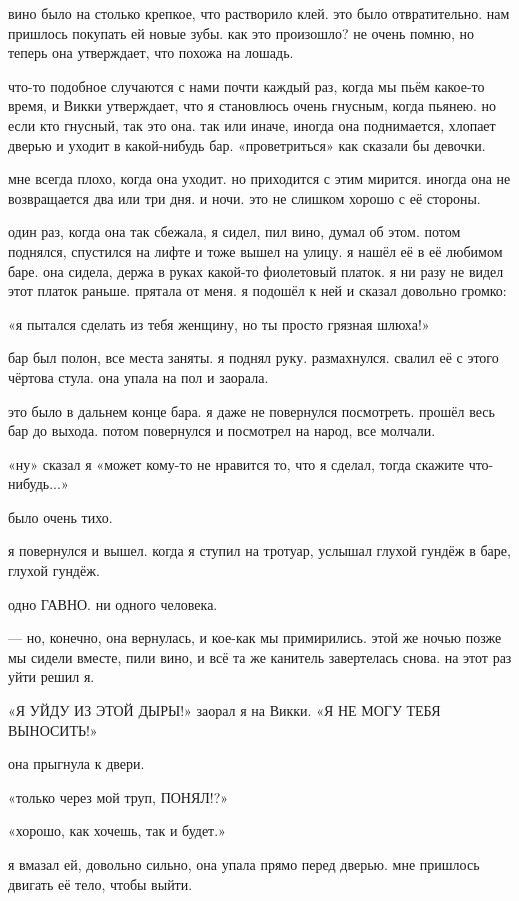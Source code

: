 вино было на столько крепкое, что растворило клей.
это было отвратительно.
нам пришлось покупать ей новые зубы.
как это произошло? не очень помню, но 
теперь она утверждает, что похожа на лошадь.

что-то подобное случаются с нами почти каждый раз, когда мы пьём какое-то
время, и Викки утверждает, что я становлюсь очень гнусным, когда пьянею.
но если кто гнусный, так это она.
так или иначе,  иногда она
поднимается, хлопает дверью и уходит в какой-нибудь бар.
«проветриться» как 
сказали бы девочки.

мне всегда плохо, когда она уходит.
но приходится с этим мирится.
иногда 
она не возвращается два или три дня.
и ночи.
это не слишком 
хорошо с её стороны.

один раз, когда она так сбежала, я сидел, пил вино, думал об этом.
потом 
поднялся, спустился на лифте и тоже вышел на улицу.
я нашёл её в её любимом 
баре.
она сидела, держа в руках какой-то фиолетовый платок.
я ни разу не видел 
этот платок раньше.
прятала от меня.
я подошёл к ней и сказал 
довольно громко:

«я пытался сделать из тебя женщину, но ты просто грязная шлюха!»

бар был полон, все места заняты.
я поднял руку.
размахнулся.
свалил её с 
этого чёртова стула.
она упала на пол и заорала.

это было в дальнем конце бара.
я даже не повернулся посмотреть.
прошёл весь бар до выхода.
потом повернулся и посмотрел на народ, все
молчали.

«ну» сказал я «может кому-то не нравится то, что я сделал, тогда
скажите что-нибудь...»

было очень тихо.

я повернулся и вышел.
когда я ступил на тротуар, услышал глухой гундёж в баре, глухой гундёж.

одно ГАВНО.
ни одного человека.

--- но, конечно, она вернулась, и кое-как мы примирились.
этой же ночью позже мы сидели вместе, пили вино, и всё та же канитель завертелась снова.
на этот раз уйти решил я.

«Я УЙДУ ИЗ ЭТОЙ ДЫРЫ!» заорал я на Викки.
«Я НЕ МОГУ ТЕБЯ ВЫНОСИТЬ!»

она прыгнула к двери.

«только через мой труп, ПОНЯЛ!?» 

«хорошо, как хочешь, так и будет.»

я вмазал ей, довольно сильно, она упала прямо перед дверью.
мне пришлось
двигать её тело, чтобы выйти.

